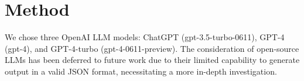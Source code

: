 \documentclass[a4paper]{article}
\begin{document}







\section{Method}
\label{sec:method}
We chose three OpenAI LLM models: ChatGPT (gpt-3.5-turbo-0611), GPT-4 (gpt-4), and GPT-4-turbo (gpt-4-0611-preview). The consideration of open-source LLMs has been deferred to future work due to their limited capability to generate output in a valid JSON format, necessitating a more in-depth investigation.
\end{document}
